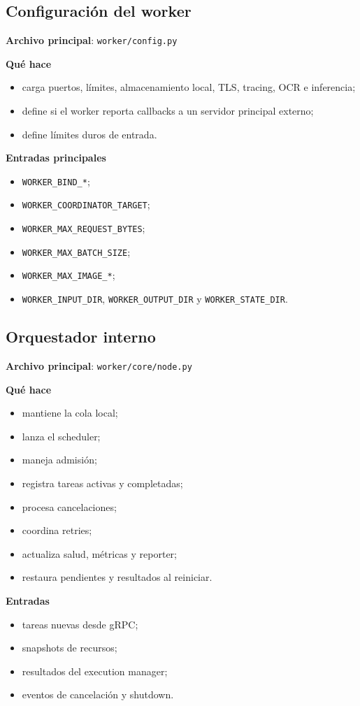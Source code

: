 \documentclass[11pt]{article}
\begin{document}
\subsection{Configuración del worker}
\textbf{Archivo principal}: \texttt{worker/config.py}

\textbf{Qué hace}
\begin{itemize}
\item carga puertos, límites, almacenamiento local, TLS, tracing, OCR e inferencia;
\item define si el worker reporta callbacks a un servidor principal externo;
\item define límites duros de entrada.
\end{itemize}

\textbf{Entradas principales}
\begin{itemize}
\item \texttt{WORKER\_BIND\_*};
\item \texttt{WORKER\_COORDINATOR\_TARGET};
\item \texttt{WORKER\_MAX\_REQUEST\_BYTES};
\item \texttt{WORKER\_MAX\_BATCH\_SIZE};
\item \texttt{WORKER\_MAX\_IMAGE\_*};
\item \texttt{WORKER\_INPUT\_DIR}, \texttt{WORKER\_OUTPUT\_DIR} y \texttt{WORKER\_STATE\_DIR}.
\end{itemize}

\subsection{Orquestador interno}
\textbf{Archivo principal}: \texttt{worker/core/node.py}

\textbf{Qué hace}
\begin{itemize}
\item mantiene la cola local;
\item lanza el scheduler;
\item maneja admisión;
\item registra tareas activas y completadas;
\item procesa cancelaciones;
\item coordina retries;
\item actualiza salud, métricas y reporter;
\item restaura pendientes y resultados al reiniciar.
\end{itemize}

\textbf{Entradas}
\begin{itemize}
\item tareas nuevas desde gRPC;
\item snapshots de recursos;
\item resultados del execution manager;
\item eventos de cancelación y shutdown.
\end{itemize}
\end{document}
